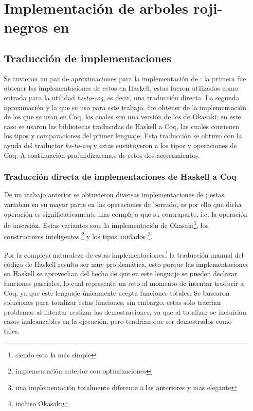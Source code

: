 \chapter{Implementación de arboles roji-negros en {\coq}}

\section{Traducción de implementaciones}
Se tuvieron un par de aproximaciones para la implementación de {\arns}: la primera fue obtener las
implementaciones de estos \cite{tesisG} en Haskell, estas fueron utilizadas como entrada para la
utilidad \textit{hs-to-coq}, es decir, una traducci\'on directa. La segunda aproximación y la que
se uso para este trabajo, fue obtener de \cite{MSetRBT} la implementaci\'on de los {\arns} que se
usan en Coq, los cuales son una versi\'on de los {\arns} de Okasaki; en este caso se usaron
las bibliotecas traducidas de Haskell a Coq, las cuales contienen los tipos y comparaciones del
primer lenguaje. Esta traducción se obtuvo con la ayuda del traductor \textit{hs-to-coq} y estas
sustituyeron a los tipos y operaciones de Coq. A continuación profundizaremos de estos 
dos acercamientos.

\subsection{Traducción directa de implementaciones de Haskell a Coq}
De un trabajo anterior \cite{tesisG} se obtuvieron diversas implementaciones de {\arns}; estas
variaban en su mayor parte en las operaciones de borrado, es por ello que dicha operación es
significativamente mas compleja que su contraparte, i.e. la operación de insersi\'on. Estas 
variantes son: la implementación de Okasaki\footnote{siendo esta la m\'as simple},
los constructores inteligentes \footnote{implementaci\'on anterior con optimizaciones} y los 
tipos anidados \footnote{una implementaci\'on totalmente diferente a las anteriores y mas elegante}.

Por la compleja naturaleza de estas implementaciones\footnote{incluso Okasaki} la traducción
manual del código de Haskell resulto ser muy problemática, esto porque las implementaciones en
Haskell se aprovechan del hecho de que en este lenguaje se pueden declarar funciones parciales, lo
cual representa un reto al momento de intentar traducir a Coq, ya que este lenguaje únicamente acepta
funciones totales. Se buscaron soluciones para totalizar estas funciones, sin embargo, estas solo
traerían problemas al intentar realizar las demostraciones, ya que al totalizar se incluirian casos
inalcanzables en la ejecuci\'on, pero tendrian que ser demostrados como tales.

